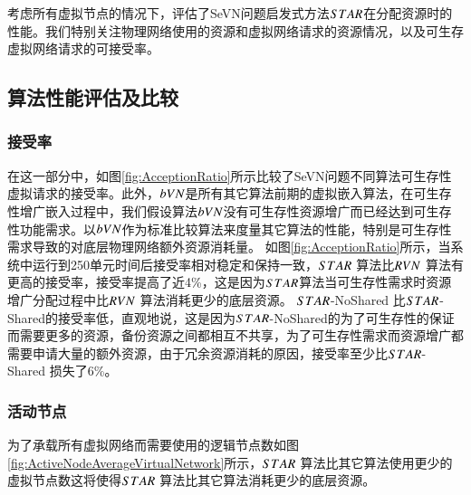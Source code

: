 考虑所有虚拟节点的情况下，评估了SeVN问题启发式方法$STAR$在分配资源时的性能。我们特别关注物理网络使用的资源和虚拟网络请求的资源情况，以及可生存虚拟网络请求的可接受率。
\subsection{算法性能评估及比较}
\subsubsection{接受率}
在这一部分中，如图\ref{fig:AcceptionRatio}所示比较了SeVN问题不同算法可生存性虚拟请求的接受率。此外，$bVN$是所有其它算法前期的虚拟嵌入算法，在可生存性增广嵌入过程中，我们假设算法$bVN$没有可生存性资源增广而已经达到可生存性功能需求。以$bVN$作为标准比较算法来度量其它算法的性能，特别是可生存性需求导致的对底层物理网络额外资源消耗量。
如图\ref{fig:AcceptionRatio}所示，当系统中运行到250单元时间后接受率相对稳定和保持一致，$STAR$ 算法比$RVN$ 算法有更高的接受率，接受率提高了近4\%，这是因为$STAR$算法当可生存性需求时资源增广分配过程中比$RVN$ 算法消耗更少的底层资源。 $STAR$-NoShared 比$STAR$-Shared的接受率低，直观地说，这是因为$STAR$-NoShared的为了可生存性的保证而需要更多的资源，备份资源之间都相互不共享，为了可生存性需求而资源增广都需要申请大量的额外资源，由于冗余资源消耗的原因，接受率至少比$STAR$-Shared 损失了6\%。

\subsubsection{活动节点}
为了承载所有虚拟网络而需要使用的逻辑节点数如图\ref{fig:ActiveNodeAverageVirtualNetwork}所示，$STAR$ 算法比其它算法使用更少的虚拟节点数这将使得$STAR$ 算法比其它算法消耗更少的底层资源。

